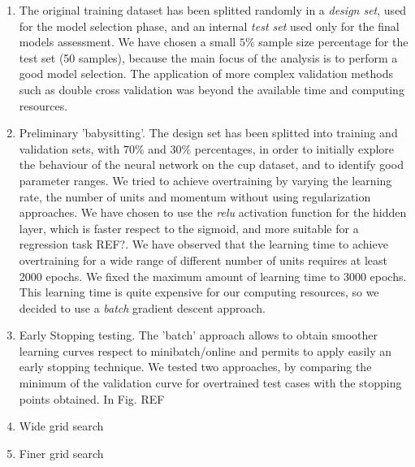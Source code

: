 \documentclass[11pt,twoside]{article}
\begin{document}
\begin{enumerate}
\item The original training dataset has been splitted randomly in a \textit{design set}, used for the model selection phase, and an internal \textit{test set} used only for the final models assessment.
  We have chosen a small $5\%$ sample size percentage for the test set (50 samples), because the main focus of the analysis is to perform a good model selection. The application of more complex validation methods such as double cross validation was beyond the available time and computing resources.
\item Preliminary 'babysitting'. The design set has been splitted into training and validation sets, with $70\%$ and $30\%$ percentages, in order to initially explore the behaviour of the neural network on the cup dataset, and to identify good parameter ranges. We tried to achieve overtraining by varying the learning rate, the number of units and momentum without using regularization approaches. We have chosen to use the \textit{relu} activation function for the hidden layer, which is faster respect to the sigmoid, and more suitable for a regression task REF?.
  We have observed that the learning time to achieve overtraining for a wide range of different number of units requires at least 2000 epochs. We fixed the maximum amount of learning time to 3000 epochs.
This learning time is quite expensive for our computing resources, so we decided to use a \textit{batch} gradient descent approach.

\item Early Stopping testing.
  The 'batch' approach allows to obtain smoother learning curves respect to minibatch/online and permits to apply easily an early stopping technique. We tested two approaches, by comparing the minimum of the validation curve for overtrained test cases with the stopping points obtained.
  In Fig. REF





\item Wide grid search


\item Finer grid search



\end{enumerate}







\end{document}
